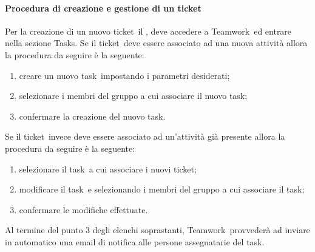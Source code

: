 \documentclass[../NormeProgetto.tex]{subfiles}
\begin{document}
			\paragraph{Procedura di creazione e gestione di un ticket}
				Per la creazione di un nuovo ticket\g\ il \responsabilediprogetto, deve accedere a Teamwork\g\ ed entrare nella sezione Tasks. Se il ticket\g\ deve essere associato ad una nuova attività allora la procedura da seguire è la seguente:
				\begin{enumerate}
					\item creare un nuovo task\g\ impostando i parametri desiderati;
					\item selezionare i membri del gruppo a cui associare il nuovo task\g;
					\item confermare la creazione del nuovo task\g.
				\end{enumerate}
				Se il ticket\g\ invece deve essere associato ad un'attività già presente allora la procedura da seguire è la seguente:
				\begin{enumerate}
					\item selezionare il task\g\ a cui associare i nuovi ticket\g;
					\item modificare il task\g\ e selezionando i membri del gruppo a cui associare il task\g;
					\item confermare le modifiche effettuate.
				\end{enumerate}
				Al termine del punto 3 degli elenchi soprastanti, Teamwork\g\ provvederà ad inviare in automatico una email di notifica alle persone assegnatarie del task\g.
				
\end{document}
